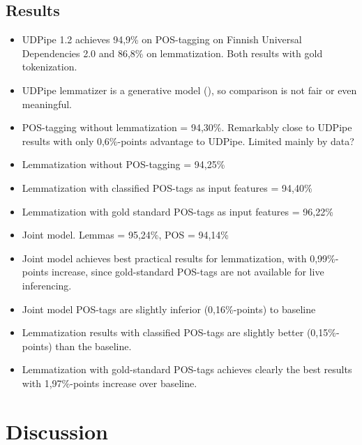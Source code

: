 \documentclass[12pt,a4paper,english
]{tutthesis}
\begin{document}
\section{Results}
\label{se:results}
\begin{itemize}
\item UDPipe 1.2 achieves 94,9\% on POS-tagging on Finnish Universal Dependencies 2.0 and 86,8\% on lemmatization. Both results with gold tokenization. \cite{udpipe-manual}
\item UDPipe lemmatizer is a generative model (\cite{Straka2017}), so comparison is not fair or even meaningful.
\item POS-tagging without lemmatization = 94,30\%. Remarkably close to UDPipe results with only 0,6\%-points advantage to UDPipe. Limited mainly by data?
\item Lemmatization without POS-tagging = 94,25\%
\item Lemmatization with classified POS-tags as input features = 94,40\%
\item Lemmatization with gold standard POS-tags as input features = 96,22\%
\item Joint model. Lemmas = 95,24\%, POS = 94,14\%
\item Joint model achieves best practical results for lemmatization, with 0,99\%-points increase, since gold-standard POS-tags are not available for live inferencing.
\item Joint model POS-tags are slightly inferior (0,16\%-points) to baseline
\item Lemmatization results with classified POS-tags are slightly better (0,15\%-points) than the baseline.
\item Lemmatization with gold-standard POS-tags achieves clearly the best results with 1,97\%-points increase over baseline.
\end{itemize}


\chapter{Discussion}
\label{ch:discussion}
\end{document}
